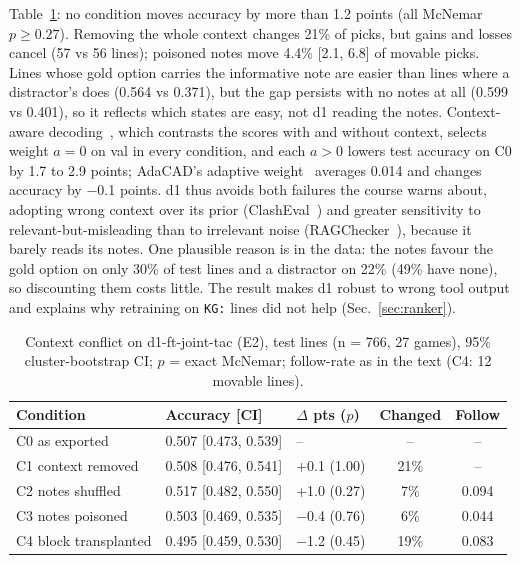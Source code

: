 \documentclass[conference]{IEEEtran}
\newcommand{\tw}[1]{\texttt{#1}}
\begin{document}
Table~\ref{tab:conflict}: no condition moves accuracy by more than 1.2 points (all McNemar $p\ge0.27$). Removing the whole context changes 21\% of picks, but gains and losses cancel (57 vs 56 lines); poisoned notes move 4.4\% [2.1, 6.8] of movable picks. Lines whose gold option carries the informative note are easier than lines where a distractor's does (0.564 vs 0.371), but the gap persists with no notes at all (0.599 vs 0.401), so it reflects which states are easy, not d1 reading the notes. Context-aware decoding~\cite{shi2024cad}, which contrasts the scores with and without context, selects weight $a=0$ on val in every condition, and each $a>0$ lowers test accuracy on C0 by 1.7 to 2.9 points; AdaCAD's adaptive weight~\cite{wang2025adacad} averages 0.014 and changes accuracy by $-$0.1 points. %
d1 thus avoids both failures the course warns about, adopting wrong context over its prior (ClashEval~\cite{wu2024clasheval}) and greater sensitivity to relevant-but-misleading than to irrelevant noise (RAGChecker~\cite{ru2024ragchecker}), because it barely reads its notes. One plausible reason is in the data: the notes favour the gold option on only 30\% of test lines and a distractor on 22\% (49\% have none), so discounting them costs little. The result makes d1 robust to wrong tool output and explains why retraining on \tw{KG:} lines did not help (Sec.~\ref{sec:ranker}). %

\begin{table}[t]
\caption{Context conflict on d1-ft-joint-tac (E2), test lines (n = 766, 27 games), 95\% cluster-bootstrap CI; $p$ = exact McNemar; follow-rate as in the text (C4: 12 movable lines).}
\label{tab:conflict}
\centering\scriptsize
\setlength{\tabcolsep}{3.5pt}
\begin{tabular}{@{}lllcc@{}}
\toprule
Condition & Accuracy [CI] & $\Delta$ pts ($p$) & Changed & Follow\\
\midrule
C0 as exported & 0.507 [0.473, 0.539] & -- & -- & --\\
C1 context removed & 0.508 [0.476, 0.541] & +0.1 (1.00) & 21\% & --\\
C2 notes shuffled & 0.517 [0.482, 0.550] & +1.0 (0.27) & 7\% & 0.094\\
C3 notes poisoned & 0.503 [0.469, 0.535] & $-$0.4 (0.76) & 6\% & 0.044\\
C4 block transplanted & 0.495 [0.459, 0.530] & $-$1.2 (0.45) & 19\% & 0.083\\
\bottomrule
\end{tabular}
\end{table}
\end{document}
